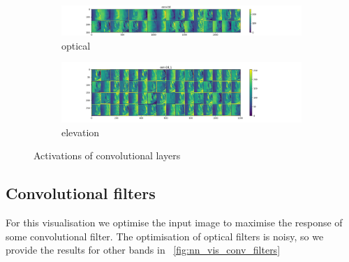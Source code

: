 \documentclass[11pt,a4paper]{article}
\begin{document}
\begin{figure}[t]
    \centering
    \begin{subfigure}[b]{\textwidth}
        \includegraphics[width=\textwidth]{graphics/nn_visualisation/intermediate_activations_conv2d.png}
        \caption{optical}
    \end{subfigure}

    \begin{subfigure}[b]{\textwidth}
        \includegraphics[width=\textwidth]{graphics/nn_visualisation/intermediate_activations_conv2d_1.png}
        \caption{elevation}
    \end{subfigure}

    \caption{Activations of convolutional layers}
    \label{fig:nn_vis_input_act}
\end{figure}

\subsection{Convolutional filters}
For this visualisation we optimise the input image to maximise the response of some convolutional filter. The
optimisation of optical filters is noisy, so we provide the results for other bands in \figurename~\ref{fig:nn_vis_conv_filters}
\end{document}
